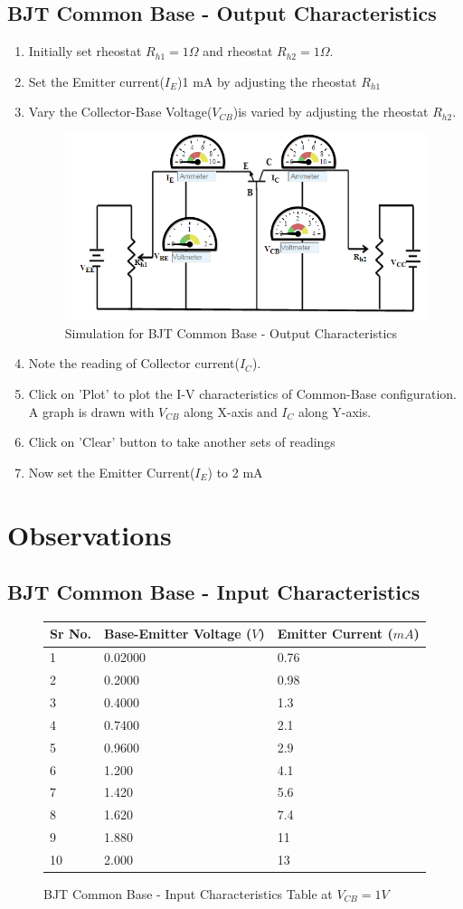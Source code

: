 		\subsection{BJT Common Base - Output Characteristics}
			\begin{enumerate}
				\tightlist
				\item Initially set rheostat $R_{h1} = 1\Omega$ and rheostat $R_{h2} = 1\Omega$.
				\item Set the Emitter current($I_E$)1 mA by adjusting the rheostat $R_{h1}$
				\item Vary the Collector-Base Voltage($V_{CB}$)is varied by adjusting the rheostat $R_{h2}$.
				\begin{figure}[h]
					\centering
					\includegraphics[width=0.7\linewidth]{img/exp10/7}
					\caption{Simulation for BJT Common Base - Output Characteristics}
					\label{fig:bjt2_procedure2}
				\end{figure}
				\item Note the reading of Collector current($I_C$).
				\item Click on 'Plot' to plot the I-V characteristics of Common-Base configuration. A graph is drawn with $V_{CB}$ along X-axis and $I_C$ along Y-axis.
				\item Click on 'Clear' button to take another sets of readings
				\item Now set the Emitter Current($I_E$) to 2 mA
			\end{enumerate}
	
	\section{Observations}
		\subsection{BJT Common Base - Input Characteristics}
			\begin{figure}[h]
				\begin{longtable}[]{@{}lll@{}}
					\toprule
					Sr No. & Base-Emitter Voltage ($V$) & Emitter Current ($mA$)\tabularnewline
					\midrule
					\endhead
					1 & 0.02000 & 0.76\tabularnewline
					2 & 0.2000 & 0.98\tabularnewline
					3 & 0.4000 & 1.3\tabularnewline
					4 & 0.7400 & 2.1\tabularnewline
					5 & 0.9600 & 2.9\tabularnewline
					6 & 1.200 & 4.1\tabularnewline
					7 & 1.420 & 5.6\tabularnewline
					8 & 1.620 & 7.4\tabularnewline
					9 & 1.880 & 11\tabularnewline
					10 & 2.000 & 13\tabularnewline
					\bottomrule
				\end{longtable}
				\caption{BJT Common Base - Input Characteristics Table at $V_{CB} = 1 V$}
			\end{figure}
			
